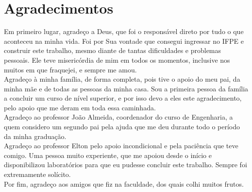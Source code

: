 \chapter*{Agradecimentos}

Em primeiro lugar, agradeço a Deus, que foi o responsável direto por tudo o que aconteceu na minha vida. Foi por Sua vontade que consegui ingressar no IFPE e construir este trabalho, mesmo diante de tantas dificuldades e problemas pessoais. Ele teve misericórdia de mim em todos os momentos, inclusive nos muitos em que fraquejei, e sempre me amou.\\

Agradeço à minha família, de forma completa, pois tive o apoio do meu pai, da minha mãe e de todas as pessoas da minha casa. Sou a primeira pessoa da família a concluir um curso de nível superior, e por isso devo a eles este agradecimento, pelo apoio que me deram em toda essa caminhada.\\

Agradeço ao professor João Almeida, coordenador do curso de Engenharia, a quem considero um segundo pai pela ajuda que me deu durante todo o período da minha graduação.\\

Agradeço ao professor Elton pelo apoio incondicional e pela paciência que teve comigo. Uma pessoa muito experiente, que me apoiou desde o início e disponibilizou laboratórios para que eu pudesse concluir este trabalho. Sempre foi extremamente solícito.\\

Por fim, agradeço aos amigos que fiz na faculdade, dos quais colhi muitos frutos.\\


